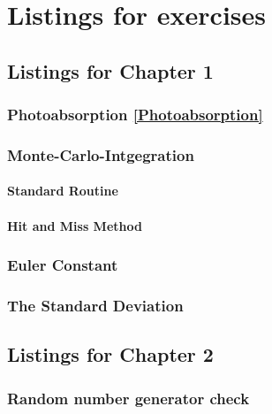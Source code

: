 %
%

\chapter{Listings for exercises}
\small

\section{Listings for Chapter 1}

\subsection{Photoabsorption \ref{Photoabsorption}}

\subsection{Monte-Carlo-Intgegration}
\subsubsection{Standard Routine}
\subsubsection{Hit and Miss Method}

\subsection{Euler Constant}

\subsection{The Standard Deviation}

\section{Listings for Chapter 2}

\subsection{Random number generator check}


